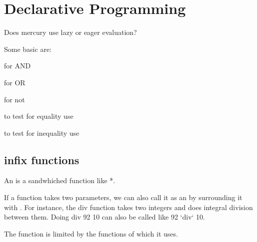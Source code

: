 \section{Declarative Programming}

Does mercury use lazy or eager evaluation?

Some basic  are:
\begin{compactitem}
\item \e{$\&\&$} for AND
\item \e{$||$} for OR
\item {} for not
\item to test for equality use \e{$==$}
\item to test for inequality use \e{$/=$}
\end{compactitem}

\subsection{infix functions}
\begin{compactitem}
\item An  is a sandwhiched function like *.
\item If a function takes two parameters, we can also call it as an  by surrounding it with . For instance, the div function takes two integers and does integral division between them. Doing div 92 10 can also be called like 92 `div` 10. 
\item The function  is limited by the functions of which it uses. 
\end{compactitem}

